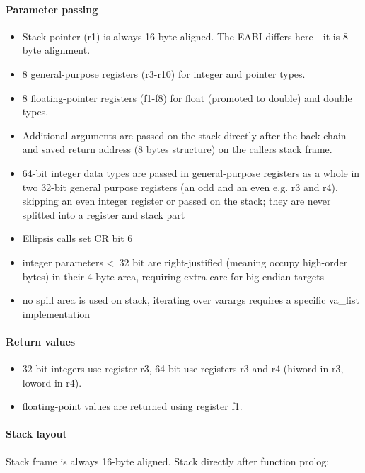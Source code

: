 \paragraph{Parameter passing}

\begin{itemize}
\item Stack pointer (r1) is always 16-byte aligned. The EABI differs here - it is 8-byte alignment.
\item 8 general-purpose registers (r3-r10) for integer and pointer types.
\item 8 floating-pointer registers (f1-f8) for float (promoted to double) and double types.
\item Additional arguments are passed on the stack directly after the back-chain and saved return address (8 bytes structure) on the callers stack frame.
\item 64-bit integer data types are passed in general-purpose registers as a whole in two
 32-bit general purpose registers (an odd and an even e.g. r3 and r4), skipping an even integer register
 or passed on the stack; they are never splitted into a register and stack part
\item Ellipsis calls set CR bit 6 
\item integer parameters \textless\ 32 bit are right-justified (meaning occupy high-order bytes) in their 4-byte area, requiring extra-care for big-endian targets
\item no spill area is used on stack, iterating over varargs requires a specific va\_list implementation
\end{itemize}

\paragraph{Return values}

\begin{itemize}
\item 32-bit integers use register r3, 64-bit use registers r3 and r4 (hiword in r3, loword in r4).
\item floating-point values are returned using register f1.
\end{itemize}


\paragraph{Stack layout}

Stack frame is always 16-byte aligned. Stack directly after function prolog:\\

